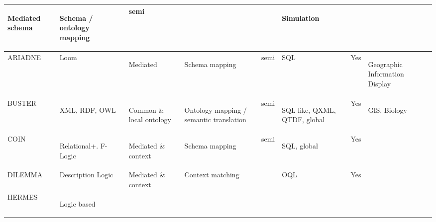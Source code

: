 \begin{longtable}{|p{}|p{}|p{}|p{}|p{}|p{}|p{}|p{}|}
\begin{spacing}{0.7}
{\tiny Mediated schema}\end{spacing}
&
\begin{spacing}{0.7}
{\tiny Schema / ontology mapping}\end{spacing}
&
{\tiny semi}&
&
&
\begin{spacing}{0.7}
{\tiny Simulation}\end{spacing}
\tabularnewline
\hline 
{\tiny ARIADNE}&
{\tiny Loom}&
\begin{spacing}{0.7}
{\tiny Mediated}\end{spacing}
&
\begin{spacing}{0.7}
{\tiny Schema mapping}\end{spacing}
&
{\tiny semi}&
{\tiny SQL}&
{\tiny Yes}&
\begin{spacing}{0.7}
{\tiny Geographic Information Display}\end{spacing}
\tabularnewline
\hline 
{\tiny BUSTER}&
\begin{spacing}{0.7}
{\tiny XML, RDF, OWL}\end{spacing}
&
\begin{spacing}{0.7}
{\tiny Common \& local ontology}\end{spacing}
&
\begin{spacing}{0.7}
{\tiny Ontology mapping / semantic translation}\end{spacing}
&
{\tiny semi}&
\begin{spacing}{0.7}
{\tiny SQL like, QXML, QTDF, global}\end{spacing}
&
{\tiny Yes}&
\begin{spacing}{0.7}
{\tiny GIS, Biology}\end{spacing}
\tabularnewline
\hline 
{\tiny COIN}&
\begin{spacing}{0.7}
{\tiny Relational+. F-Logic}\end{spacing}
&
\begin{spacing}{0.7}
{\tiny Mediated \& context}\end{spacing}
&
\begin{spacing}{0.7}
{\tiny Schema mapping}\end{spacing}
&
{\tiny semi}&
\begin{spacing}{0.7}
{\tiny SQL, global}\end{spacing}
&
{\tiny Yes}&
\tabularnewline
\hline 
{\tiny DILEMMA}&
{\tiny Description Logic}&
{\tiny Mediated \& context}&
{\tiny Context matching}&
&
{\tiny OQL}&
{\tiny Yes}&
\tabularnewline
\hline 
{\tiny HERMES}&
\begin{spacing}{0.7}
{\tiny Logic based}\end{spacing}

\end{longtable}

